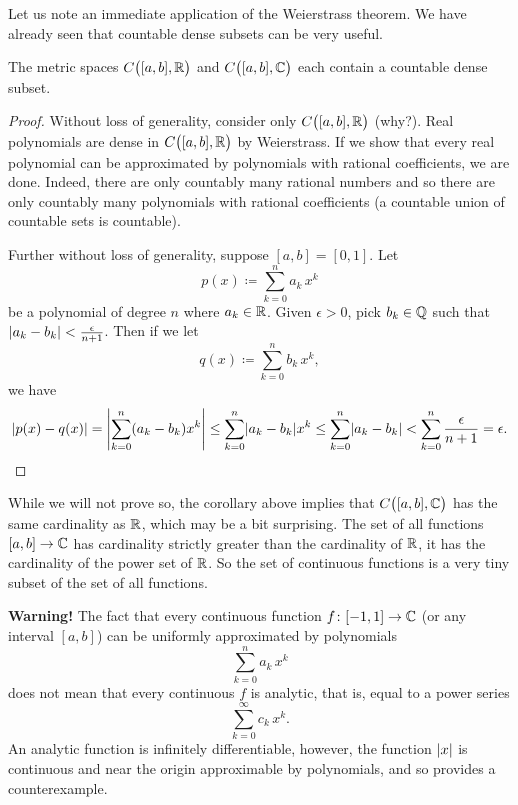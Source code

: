 Let us note an immediate application of the Weierstrass theorem.  We have
already seen that countable dense subsets can be very useful.

\begin{cor}
The metric spaces $C\bigl([a,b],{\mathbb{R}}\bigr)$ and $C\bigl([a,b],{\mathbb{C}}\bigr)$ each contain a countable dense subset.
\end{cor}

\begin{proof}
Without loss of generality, consider only
$C\bigl([a,b],{\mathbb{R}}\bigr)$
(why?).
Real polynomials are dense in $C\bigl([a,b],{\mathbb{R}}\bigr)$ by Weierstrass.
If we show that
every real polynomial can be approximated by polynomials with rational
coefficients, we are done.
Indeed, there are only countably many
rational numbers and so there are only countably many polynomials with
rational coefficients (a countable union of countable sets is countable).

Further without loss of generality, suppose $[a,b]=[0,1]$.  Let
\begin{equation*}
p(x) \coloneqq \sum_{k=0}^n a_k\,  x^k
\end{equation*}
be a polynomial of degree $n$ where $a_k \in {\mathbb{R}}$.  Given $\epsilon > 0$, pick $b_k \in {\mathbb{Q}}$
such that $\lvert {a_k-b_k} \rvert < \frac{\epsilon}{n+1}$.  Then
if we let
\begin{equation*}
q(x) \coloneqq \sum_{k=0}^n b_k \, x^k ,
\end{equation*}
we have
\begin{equation*}
\lvert {p(x)-q(x)} \rvert
=
\left\lvert {\sum_{k=0}^n (a_k-b_k) x^k} \right\rvert
\leq
\sum_{k=0}^n \lvert {a_k-b_k} \rvert x^k
\leq
\sum_{k=0}^n \lvert {a_k-b_k} \rvert
<
\sum_{k=0}^n \frac{\epsilon}{n+1} = \epsilon . \qedhere
\end{equation*}
\end{proof}

\begin{remark}
While we will not prove so, the corollary above implies that
$C\bigl([a,b],{\mathbb{C}}\bigr)$ has the same cardinality as ${\mathbb{R}}$, which may be a
bit surprising.  The set of all functions $[a,b] \to {\mathbb{C}}$ has
cardinality strictly greater than the cardinality of ${\mathbb{R}}$, it has the
cardinality of the power set of ${\mathbb{R}}$.  So the
set of continuous functions is a very tiny subset of the set of all
functions.
\end{remark}

\textbf{Warning!}
The fact that every continuous function $f \colon [-1,1] \to {\mathbb{C}}$ (or any
interval $[a,b]$) can be uniformly
approximated by polynomials
\begin{equation*}
\sum_{k=0}^n a_k\,  x^k
\end{equation*}
does not mean that every continuous $f$ is analytic, that is, equal to a
power series
\begin{equation*}
\sum_{k=0}^\infty c_k\,  x^k .
\end{equation*}
An analytic function is infinitely differentiable,
however,
the function $\lvert {x} \rvert$ is continuous and near the origin
approximable by polynomials,
and so provides a counterexample.

